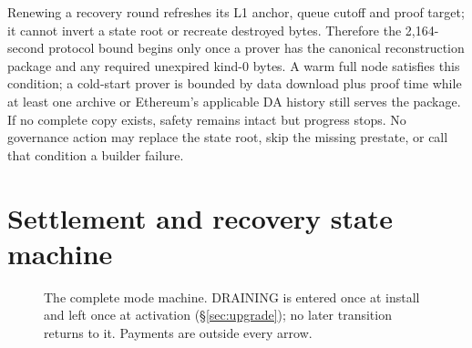 \documentclass[a4paper,11pt]{article}
\begin{document}
Renewing a recovery round refreshes its L1 anchor, queue cutoff and proof
target; it cannot invert a state root or recreate destroyed bytes.  Therefore
the 2,164-second protocol bound begins only once a prover has the canonical
reconstruction package and any required unexpired kind-0 bytes.  A warm full
node satisfies this condition; a cold-start prover is bounded by data download
plus proof time while at least one archive or Ethereum's applicable DA history
still serves the package.  If no complete copy exists, safety remains intact
but progress stops.  No governance action may replace the state root, skip the
missing prestate, or call that condition a builder failure.

\section{Settlement and recovery state machine}\label{sec:machine}

\begin{figure}[htbp]
\centering
{}
\caption{The complete mode machine.  DRAINING is entered once at install and
left once at activation (\S\ref{sec:upgrade}); no later transition returns to
it.  Payments are outside every arrow.}
\end{figure}
\end{document}
